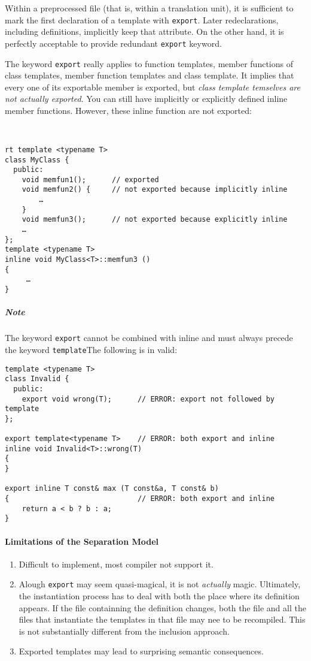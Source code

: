 \documentclass[11pt, a4paper]{book}
\begin{document}
Within a preprocessed file (that is, within a translation unit), it is sufficient to mark the first declaration of a template with \verb|export|. Later redeclarations, including definitions, implicitly keep that attribute. On the other hand, it is perfectly acceptable to provide redundant \verb|export| keyword.

The keyword \verb|export| really applies to function templates, member functions of class templates, member function templates and class template. It implies that every one of its exportable member is exported, but \emph{class template temselves are not actually exported}. You can still have implicitly or explicitly defined inline member functions. However, these inline function are not exported:
\begin{verbatim}


rt template <typename T> 
class MyClass { 
  public: 
    void memfun1();      // exported 
    void memfun2() {     // not exported because implicitly inline 
        … 
    } 
    void memfun3();      // not exported because explicitly inline 
    … 
}; 
template <typename T> 
inline void MyClass<T>::memfun3 () 
{ 
     … 
} 
\end{verbatim}
\subparagraph{Note} The keyword \verb|export| cannot be combined with inline and must always precede the keyword \verb|template|The following is in valid:
\begin{verbatim}
template <typename T> 
class Invalid { 
  public: 
    export void wrong(T);      // ERROR: export not followed by template 
}; 

export template<typename T>    // ERROR: both export and inline 
inline void Invalid<T>::wrong(T) 
{ 
} 

export inline T const& max (T const&a, T const& b) 
{                              // ERROR: both export and inline 
    return a < b ? b : a; 
} 
\end{verbatim}
\paragraph{Limitations of the Separation Model}
\begin{enumerate}
\item Difficult to implement, most compiler not support it.
\item Alough \verb|export| may seem quasi-magical, it is not \emph{actually} magic. Ultimately, the instantiation process has to deal with both the place where its definition appears. If the file containning the definition changes, both the file and all the files that instantiate the templates in that file may nee to be recompiled. This is not substantially different from the inclusion approach.
\item Exported templates may lead to surprising semantic consequences.
\end{enumerate}
\end{document}
